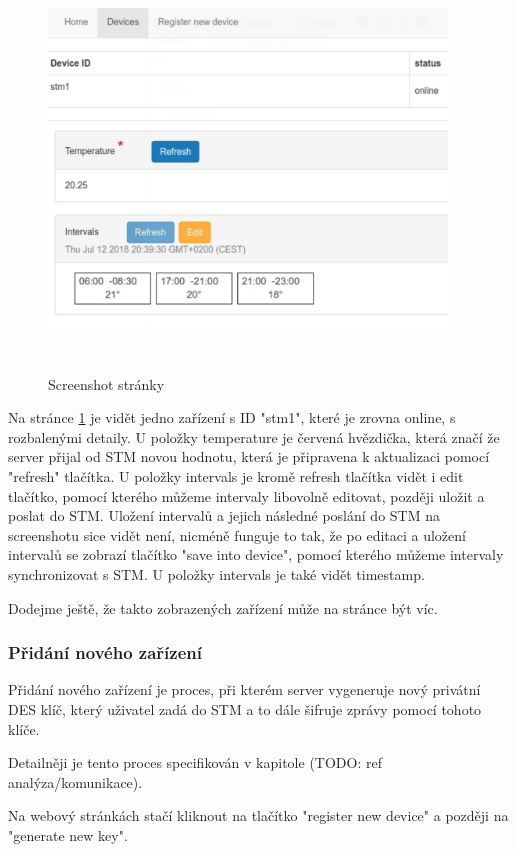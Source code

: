 \begin{figure}[tbh!]
\includegraphics[width=400px, height=400px]{../img/devices_screenshot.pdf}
\caption{Screenshot  stránky}
\label{devices-screenshot}
\end{figure}

Na stránce \ref{devices-screenshot} je vidět jedno zařízení s ID "stm1", které je zrovna online, s
rozbalenými detaily.
U položky temperature je červená hvězdička, která značí že server přijal od STM novou hodnotu, která
je připravena k aktualizaci pomocí "refresh" tlačítka.
U položky intervals je kromě refresh tlačítka vidět i edit tlačítko, pomocí kterého můžeme intervaly
libovolně editovat, později uložit a poslat do STM.
Uložení intervalů a jejich následné poslání do STM na screenshotu sice vidět není, nicméně funguje to
tak, že po editaci a uložení intervalů se zobrazí tlačítko "save into device", pomocí kterého můžeme
intervaly synchronizovat s STM.
U položky intervals je také vidět timestamp.

Dodejme ještě, že takto zobrazených zařízení může na stránce být víc.

\subsubsection{Přidání nového zařízení}
Přidání nového zařízení je proces, při kterém server vygeneruje nový privátní DES klíč, který uživatel
zadá do STM a to dále šifruje zprávy pomocí tohoto klíče.

Detailněji je tento proces specifikován v kapitole (TODO: ref analýza/komunikace).

Na webový stránkách stačí kliknout na tlačítko "register new device" a později na "generate new key".


